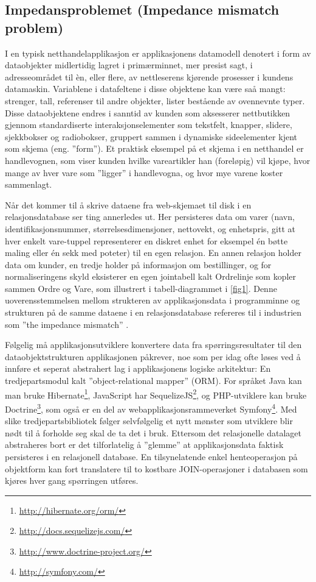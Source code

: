 \subsection{Impedansproblemet (Impedance mismatch problem)}

I en typisk netthandelapplikasjon er applikasjonens datamodell denotert i form av dataobjekter midlertidig lagret i primærminnet, mer presist sagt, i adresseområdet til èn, eller flere, av nettleserens kjørende prosesser i kundens datamaskin. Variablene i datafeltene i disse objektene kan være saå mangt: strenger, tall, referenser til andre objekter, lister bestående av ovennevnte typer. Disse dataobjektene endres i sanntid av kunden som aksesserer nettbutikken gjennom standardiserte interaksjonselementer som tekstfelt, knapper, slidere, sjekkbokser og radiobokser, gruppert sammen i dynamiske sideelementer kjent som skjema (eng. ''form''). Et praktisk eksempel på et skjema i en netthandel er handlevognen, som viser kunden hvilke vareartikler han (foreløpig) vil kjøpe, hvor mange av hver vare som ''ligger'' i handlevogna, og hvor mye varene koster sammenlagt.

Når det kommer til å skrive dataene fra web-skjemaet til disk i en relasjonsdatabase ser ting annerledes ut. Her persisteres data om varer (navn, identifikasjonsnummer, størrelsesdimensjoner, nettovekt, og enhetspris, gitt at hver enkelt vare-tuppel representerer en diskret enhet for eksempel én bøtte maling eller én sekk med poteter) til en egen relasjon. En annen relasjon holder data om kunder, en tredje holder på informasjon om bestillinger, og for normaliseringens skyld eksisterer en egen jointabell kalt Ordrelinje som kopler sammen Ordre og Vare, som illustrert i tabell-diagrammet i \ref{fig1}. Denne uoverensstemmelsen mellom strukteren av applikasjonsdata i programminne og strukturen på de samme dataene i en relasjonsdatabase refereres til i industrien som ''the impedance mismatch'' \citep{sadalage2013}.

Følgelig må applikasjonsutviklere konvertere data fra spørringsresultater til den dataobjektstrukturen applikasjonen påkrever, noe som per idag ofte løses ved å innføre et seperat abstrahert lag i applikasjonens logiske arkitektur: En tredjepartsmodul kalt ''object-relational mapper'' (ORM). For språket Java kan man bruke Hibernate\footnote{\url{http://hibernate.org/orm/}}, JavaScript har SequelizeJS\footnote{\url{http://docs.sequelizejs.com/}}, og PHP-utviklere kan bruke Doctrine\footnote{\url{http://www.doctrine-project.org/}}, som også er en del av webapplikasjonsrammeverket Symfony\footnote{\url{http://symfony.com/}}. Med slike tredjepartsbibliotek følger selvfølgelig et nytt mønster som utviklere blir nødt til å forholde seg skal de ta det i bruk. Ettersom det relasjonelle datalaget abstraheres bort er det tilforlatelig å ''glemme'' at applikasjonsdata faktisk persisteres i en relasjonell database. En tilsynelatende enkel henteoperasjon på objektform kan fort translatere til to kostbare JOIN-operasjoner i databasen som kjøres hver gang spørringen utføres.

